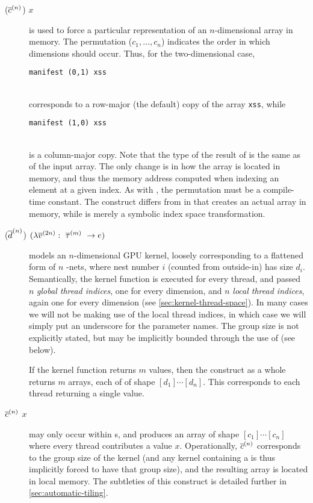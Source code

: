 \begin{description}
\item[ ($\nseq{c}{n}$) $x$] is used to force a particular
  representation of an $n$-dimensional array in memory.  The
  permutation ($c_{1}, \ldots, c_{n}$) indicates the order in
  which dimensions should occur.  Thus, for the two-dimensional case,\\
  \centerline{\mbox{\lstinline{manifest (0,1) xss}}}\\
  corresponds to a row-major
  (the default) copy of the array \lstinline{xss}, while\\
  \centerline{\mbox{\lstinline{manifest (1,0) xss}}}\\
  is a column-major copy.  Note that the type of the result of
   is the same as of the input array.  The only change is
  in how the array is located in memory, and thus the memory address
  computed when indexing an element at a given index.  As with
  , the permutation must be a compile-time constant.
  The  construct differs from  in that
   creates an actual array in memory, while
   is merely a symbolic index space transformation.
\item[ ($\nseq{d}{n}$)
  $(\Fn{\nseq{\tau}{m}}{\nseq{v}{2n}}{e})$] models an $n$-dimensional
  GPU kernel, loosely corresponding to a flattened form of $n$
  -nets, where nest number $i$ (counted from outside-in) has
  size $d_{i}$.  Semantically, the kernel function is executed for
  every thread, and passed $n$ \textit{global thread indices}, one for
  every dimension, and $n$ \textit{local thread indices}, again one
  for every dimension (see \cref{sec:kernel-thread-space}).  In many
  cases we will not be making use of the local thread indices, in
  which case we will simply put an underscore for the parameter names.
  The group size is not explicitly stated, but may be implicitly
  bounded through the use of  (see below).

  If the kernel function returns $m$ values, then the 
  construct as a whole returns $m$ arrays, each of of shape
  $[d_{1}]\cdots[d_{n}]$.  This corresponds to each thread returning a
  single value.
\item[ $\nseq{c}{n}$ $x$] may only occur within
  s, and produces an array of shape $[c_{1}]\cdots[c_{n}]$
  where every thread contributes a value $x$.  Operationally,
  $\nseq{c}{n}$ corresponds to the group size of the kernel (and any
  kernel containing a  is thus implicitly forced to have
  that group size), and the resulting array is located in local
  memory.  The subtleties of this construct is detailed further in
  \cref{sec:automatic-tiling}.
\end{description}

